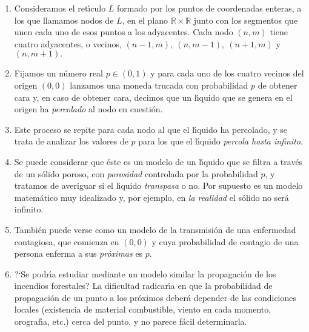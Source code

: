 \begin{enumerate}
\item Consideramos el ret\'{\i}culo $L$ formado por los puntos de coordenadas 
enteras, a los que llamamos nodos de $L$, en el plano $\mathbb{R} \times 
\mathbb{R}$ junto con los segmentos que unen cada uno de esos puntos a los 
adyacentes. Cada nodo $(n, m)$ tiene
cuatro adyacentes, o vecinos, $(n-1, m),\  (n, m-1),\  (n + 1, m)$  y $(n, m 
+ 1).$
\item Fijamos un n\'umero real $p\in (0, 1)$ y para cada uno de los cuatro 
vecinos del origen $(0, 0)$ lanzamos una moneda trucada con probabilidad $p$ de 
obtener cara y, en caso de obtener cara, decimos que un l\'{\i}quido que se 
genera en el
origen ha {\itshape percolado} al nodo en cuesti\'on.
\item Este proceso se repite para cada nodo al que el l\'{\i}quido ha 
percolado, 
y se trata de analizar los valores de
$p$ para los que el l\'{\i}quido {\itshape percola hasta infinito}.
\item Se puede considerar que \'este es un modelo de un l\'{\i}quido que se 
filtra a trav\'es de un s\'olido poroso, con {\itshape porosidad}
controlada por la probabilidad $p$, y tratamos de averiguar si el l\'{\i}quido 
{\itshape transpasa} o no. Por supuesto es un modelo matem\'atico muy 
idealizado 
y, por ejemplo, en {\itshape la realidad} el s\'olido no ser\'a infinito.
\item  Tambi\'en puede verse como un modelo de la transmisi\'on de una 
enfermedad contagiosa, que comienza en $(0, 0)$ y cuya probabilidad de contagio 
de una persona enferma a sus {\itshape pr\'oximas} es $p.$
\item  ?`Se podr\'{\i}a estudiar mediante un modelo similar la propagaci\'on de 
los incendios forestales? La dificultad radicar\'{\i}a en que la probabilidad 
de 
propagaci\'on de un punto a los pr\'oximos deber\'a depender de las condiciones 
locales (existencia de material combustible, viento en cada momento, 
orograf\'{\i}a, etc.) cerca del punto, y no parece f\'acil determinarla.

\end{enumerate}

